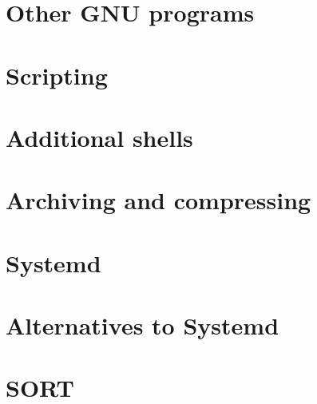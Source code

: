 \documentclass[oneside]{book}
\begin{document}
\part{Other GNU programs}






\part{Scripting}


\part{Additional shells}





\part{Archiving and compressing}




\part{Systemd}


\part{Alternatives to Systemd}


\part{SORT}

\end{document}
